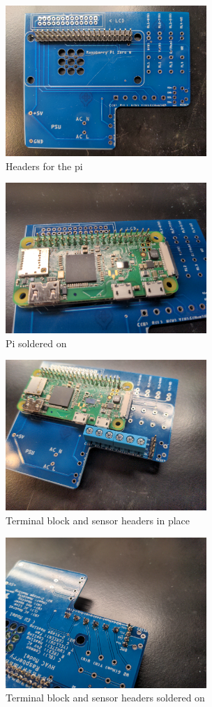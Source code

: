 \begin{figure}
  \centering
  \includegraphics[width=3in]{img/pi_header_placement_soldered_on.jpg}
  \caption{Headers for the pi}
  \label{fig:pi_headers}
\end{figure}
\begin{figure}
  \centering
  \includegraphics[width=3in]{img/pi_soldered_on.jpg}
  \caption{Pi soldered on}
  \label{fig:pi}
\end{figure}
\begin{figure}
  \centering
  \includegraphics[width=3in]{img/terminal_block_placement.jpg}
  \caption{Terminal block and sensor headers in place}
  \label{fig:terminal_block_in_place}
\end{figure}
\begin{figure}
  \centering
  \includegraphics[width=3in]{img/terminal_block_soldered.jpg}
  \caption{Terminal block and sensor headers soldered on}
  \label{fig:terminal_block_soldered}
\end{figure}
